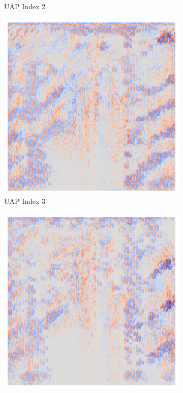 \begin{figure}[ht!]
\begin{subfigure}{0.19\linewidth}
        \caption{UAP Index 2}
    \end{subfigure}\hfill%
    \begin{subfigure}{0.19\linewidth}
        \centering
        \includegraphics[height=1\linewidth]{01-images/05-resultate/uap_resnet/uap3-resnet18-covid-n200-robustificationslevel0.png}
        \caption{UAP Index 3}
    \end{subfigure}\hfill%
    \begin{subfigure}{0.19\linewidth}
        \centering
        \includegraphics[height=1\linewidth]{01-images/05-resultate/uap_resnet/uap4-resnet18-covid-n200-robustificationslevel0.png}

\end{subfigure}
\end{figure}
